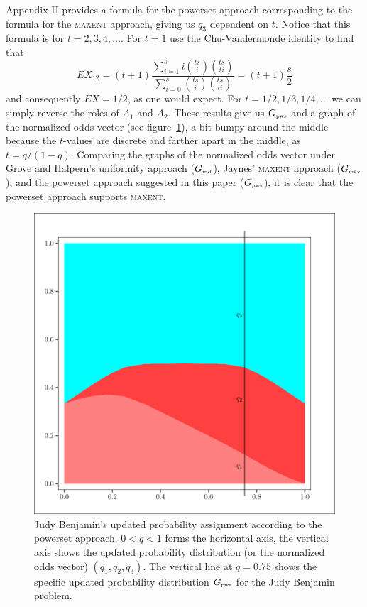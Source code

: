 \documentclass[12pt]{article}
\def\lwv{.6}
\begin{document}
Appendix II provides a formula for the powerset approach corresponding
to the formula for the \textsc{maxent} approach, giving us $q_{3}$
dependent on $t$. Notice that this formula is for $t=2,3,4,\ldots$.
For $t=1$ use the Chu-Vandermonde identity to find that
\begin{displaymath}
  EX_{12}=(t+1)\frac{\sum_{i=1}^{s}i\binom{ts}{i}\binom{ts}{ti}}{\sum_{i=0}^{s}\binom{ts}{i}\binom{ts}{ti}}=(t+1)\frac{s}{2}  
\end{displaymath}
and consequently $EX=1/2$, as one would expect. For
$t=1/2,1/3,1/4,\ldots$ we can simply reverse the roles of $A_{1}$ and
$A_{2}$. These results give us $G_{\mbox{\tiny pws}}$ and a graph of
the normalized odds vector (see figure~\ref{fig:pwst}), a bit bumpy
around the middle because the $t$-values are discrete and farther
apart in the middle, as $t=q/(1-q)$. Comparing the graphs of the
normalized odds vector under Grove and Halpern's uniformity approach
($G_{\mbox{\tiny ind}}$), Jaynes' \textsc{maxent} approach
($G_{\mbox{\tiny max}}$), and the powerset approach suggested in this
paper ($G_{\mbox{\tiny pws}}$), it is clear that the powerset approach
supports \textsc{maxent}.

\begin{figure}[h]
  \begin{flushright}
    \begin{minipage}[h]{\lwv\linewidth}
      \includegraphics[width=\textwidth]{zeroone-pwst.pdf}
      \caption{Judy Benjamin's updated probability assignment
        according to the powerset approach. $0<q<1$ forms the
        horizontal axis, the vertical axis shows the updated
        probability distribution (or the normalized odds vector)
        $(q_{1},q_{2},q_{3})$. The vertical line at $q=0.75$ shows the
        specific updated probability distribution $G_{\mbox{\tiny
            pws}}$ for the Judy Benjamin problem.}
      \label{fig:pwst}
    \end{minipage}
  \end{flushright}
\end{figure}
\end{document}
